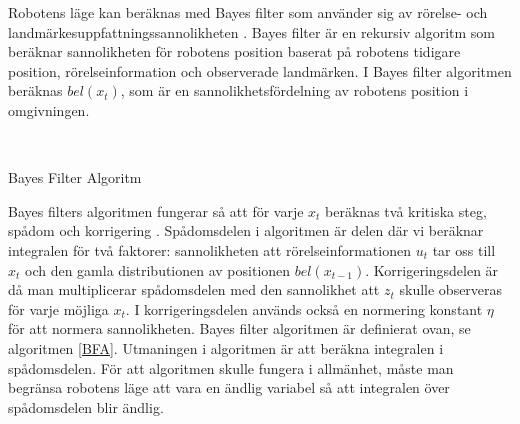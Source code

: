Robotens läge kan beräknas med Bayes filter som använder sig av rörelse- och landmärkesuppfattningssannolikheten \citep{ProbabilisticRobotics}. Bayes filter är en rekursiv algoritm som beräknar sannolikheten för robotens position baserat på robotens tidigare position, rörelseinformation och observerade landmärken. I Bayes filter algoritmen beräknas $bel(x_t)$, som är en sannolikhetsfördelning av robotens position i omgivningen.

\begin{algorithm}[H] \label{BFA}
    \SetAlgoLined
     \\
    \caption{Bayes Filter Algoritm}
\end{algorithm}

Bayes filters algoritmen fungerar så att för varje $x_t$ beräknas två kritiska steg, spådom och korrigering \citep{ProbabilisticRobotics}. Spådomsdelen i algoritmen är delen där vi beräknar integralen för två faktorer: sannolikheten att rörelseinformationen $u_t$ tar oss till $x_t$ och den gamla distributionen av positionen $bel(x_{t-1})$. Korrigeringsdelen är då man multiplicerar spådomsdelen med den sannolikhet att $z_t$ skulle observeras för varje möjliga $x_t$. I korrigeringsdelen används också en normering konstant $\eta$ för att normera sannolikheten. Bayes filter algoritmen är definierat ovan, se algoritmen \ref{BFA}. Utmaningen i algoritmen är att beräkna integralen i spådomsdelen. För att algoritmen skulle fungera i allmänhet, måste man begränsa robotens läge att vara en ändlig variabel så att integralen över spådomsdelen blir ändlig.

